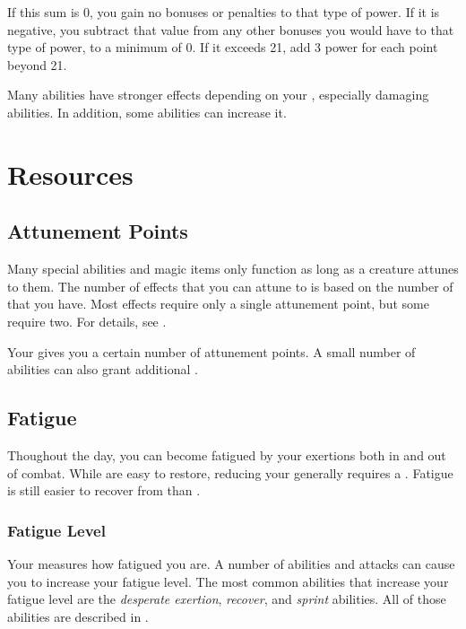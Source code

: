         If this sum is 0, you gain no bonuses or penalties to that type of power.
        If it is negative, you subtract that value from any other bonuses you would have to that type of power, to a minimum of 0.
        If it exceeds 21, add 3 power for each point beyond 21.

        Many abilities have stronger effects depending on your , especially damaging abilities.
        In addition, some abilities can increase it.

\section{Resources}\label{Resources}

    \subsection{Attunement Points}\label{Attunement Points}
        Many special abilities and magic items only function as long as a creature attunes to them.
        The number of effects that you can attune to is based on the number of  that you have.
        Most effects require only a single attunement point, but some require two.
        For details, see .

        Your  gives you a certain number of attunement points.
        A small number of abilities can also grant additional .

    \subsection{Fatigue}\label{Fatigue}
        Thoughout the day, you can become fatigued by your exertions both in and out of combat.
        While  are easy to restore, reducing your  generally requires a .
        Fatigue is still easier to recover from than .

        \subsubsection{Fatigue Level}\label{Fatigue Level}
            Your  measures how fatigued you are.
            A number of abilities and attacks can cause you to increase your fatigue level.
            The most common abilities that increase your fatigue level are the \textit{desperate exertion}, \textit{recover}, and \textit{sprint} abilities.
            All of those abilities are described in .

